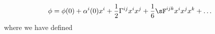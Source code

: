 \begin{equation}
\phi = \phi(0) + \alpha^i(0) x^i + \frac{1}{2}\Gamma^{ij} x^i x^j+ \frac{1}{6} \sF^{ijk} x^i x^j x^k + \ldots 
\end{equation}
where we have defined